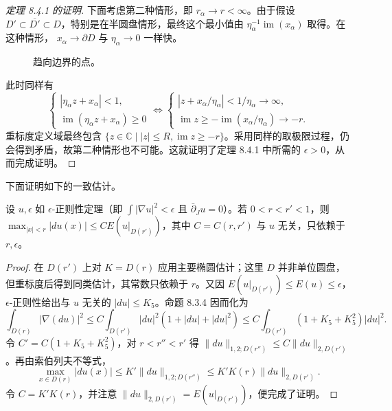 \begin{proof}[定理 8.4.1 的证明]
下面考虑第二种情形，即 $r_\alpha\to r<\infty$。由于假设
$D'\subset\overline{D'}\subset D$，特别是在半圆盘情形，最终这个最小值由
$\eta_\alpha^{-1}\operatorname{im}(x_\alpha)$ 取得。在这种情形，
$x_\alpha\to\partial D$ 与 $\eta_\alpha\to0$ 一样快。
\begin{figure}[htbp]
\centering
{}
\caption{趋向边界的点。}
\label{fig:ch8-points-tending-boundary}
\end{figure}
此时同样有
\[
 \begin{cases}|\eta_\alpha z+x_\alpha|<1,\\
 \operatorname{im}(\eta_\alpha z+x_\alpha)\geq0
 \end{cases}
 \Longleftrightarrow
 \begin{cases}|z+x_\alpha/\eta_\alpha|<1/\eta_\alpha\to\infty,\\
 \operatorname{im}z\geq-\operatorname{im}(x_\alpha/\eta_\alpha)\to-r.
 \end{cases}
\]
重标度定义域最终包含
$\{z\in\mathbb C\mid |z|\leq R,\operatorname{im}z\geq-r\}$。采用同样的取极限过程，仍会得到矛盾，故第二种情形也不可能。这就证明了定理 8.4.1 中所需的 $\epsilon>0$，从而完成证明。
\end{proof}

下面证明如下的一致估计。
\begin{proposition}\label{prop:ch8-uniform-derivative-estimate}
设 $u,\epsilon$ 如 $\epsilon$-正则性定理（即 $\int|\nabla u|^2<\epsilon$ 且
$\bar\partial_Ju=0$）。若 $0<r<r'<1$，则
$\max_{|x|<r}|du(x)|\leq CE(u|_{D(r')})$，其中 $C=C(r,r')$ 与 $u$ 无关，只依赖于 $r,\epsilon$。
\end{proposition}
\begin{proof}
在 $D(r')$ 上对 $K=D(r)$ 应用主要椭圆估计；这里 $D$ 并非单位圆盘，但重标度后得到同类估计，其常数只依赖于 $r$。又因
$E(u|_{D(r')})\leq E(u)\leq\epsilon$，$\epsilon$-正则性给出与 $u$ 无关的
$|du|\leq K_5$。命题 8.3.4 因而化为
\[
 \int_{D(r)}|\nabla(du)|^2\leq C\int_{D(r')}|du|^2(1+|du|+|du|^2)
 \leq C\int_{D(r')}(1+K_5+K_5^2)|du|^2.
\]
令 $C'=C(1+K_5+K_5^2)$，对 $r<r''<r'$ 得
$\|du\|_{1,2;D(r'')}\leq C\|du\|_{2,D(r')}$。再由索伯列夫不等式，
\[
 \max_{x\in D(r)}|du(x)|\leq K'\|du\|_{1,2;D(r'')}
 \leq K'K(r)\|du\|_{2,D(r')}.
\]
令 $C=K'K(r)$，并注意 $\|du\|_{2,D(r')}=E(u|_{D(r')})$，便完成了证明。
\end{proof}


